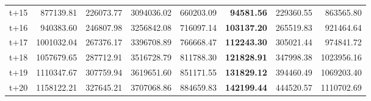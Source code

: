 \begin{table}[H]
\begin{tabular}{lrrrrrrr}
t+15  & 877139.81  & 226073.77  & 3094036.02  & 660203.09  & \textbf{94581.56}  & 229360.55  & 863565.80  \\
t+16  & 940383.60  & 246807.98  & 3256842.08  & 716097.14  & \textbf{103137.20}  & 265519.83  & 921464.64  \\
t+17  & 1001032.04  & 267376.17  & 3396708.89  & 766668.47  & \textbf{112243.30}  & 305021.44  & 974841.72  \\
t+18  & 1057679.65  & 287712.91  & 3516728.79  & 811788.30  & \textbf{121828.91}  & 347998.38  & 1023956.16  \\
t+19  & 1110347.67  & 307759.94  & 3619651.60  & 851171.55  & \textbf{131829.12}  & 394460.49  & 1069203.40  \\
t+20  & 1158122.21  & 327645.21  & 3707068.86  & 884659.83  & \textbf{142199.44}  & 444520.57  & 1110702.69  \\

\bottomrule
\end{tabular}
\end{table}
